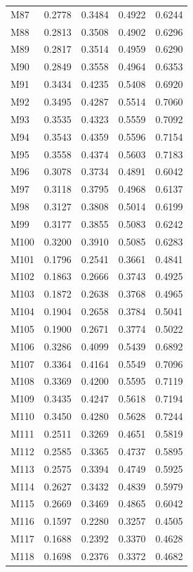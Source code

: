 \begin{longtable}{lrrrr}
M87 & 0.2778 & 0.3484 & 0.4922 & 0.6244 \\
M88 & 0.2813 & 0.3508 & 0.4902 & 0.6296 \\
M89 & 0.2817 & 0.3514 & 0.4959 & 0.6290 \\
M90 & 0.2849 & 0.3558 & 0.4964 & 0.6353 \\
M91 & 0.3434 & 0.4235 & 0.5408 & 0.6920 \\
M92 & 0.3495 & 0.4287 & 0.5514 & 0.7060 \\
M93 & 0.3535 & 0.4323 & 0.5559 & 0.7092 \\
M94 & 0.3543 & 0.4359 & 0.5596 & 0.7154 \\
M95 & 0.3558 & 0.4374 & 0.5603 & 0.7183 \\
M96 & 0.3078 & 0.3734 & 0.4891 & 0.6042 \\
M97 & 0.3118 & 0.3795 & 0.4968 & 0.6137 \\
M98 & 0.3127 & 0.3808 & 0.5014 & 0.6199 \\
M99 & 0.3177 & 0.3855 & 0.5083 & 0.6242 \\
M100 & 0.3200 & 0.3910 & 0.5085 & 0.6283 \\
M101 & 0.1796 & 0.2541 & 0.3661 & 0.4841 \\
M102 & 0.1863 & 0.2666 & 0.3743 & 0.4925 \\
M103 & 0.1872 & 0.2638 & 0.3768 & 0.4965 \\
M104 & 0.1904 & 0.2658 & 0.3784 & 0.5041 \\
M105 & 0.1900 & 0.2671 & 0.3774 & 0.5022 \\
M106 & 0.3286 & 0.4099 & 0.5439 & 0.6892 \\
M107 & 0.3364 & 0.4164 & 0.5549 & 0.7096 \\
M108 & 0.3369 & 0.4200 & 0.5595 & 0.7119 \\
M109 & 0.3435 & 0.4247 & 0.5618 & 0.7194 \\
M110 & 0.3450 & 0.4280 & 0.5628 & 0.7244 \\
M111 & 0.2511 & 0.3269 & 0.4651 & 0.5819 \\
M112 & 0.2585 & 0.3365 & 0.4737 & 0.5895 \\
M113 & 0.2575 & 0.3394 & 0.4749 & 0.5925 \\
M114 & 0.2627 & 0.3432 & 0.4839 & 0.5979 \\
M115 & 0.2669 & 0.3469 & 0.4865 & 0.6042 \\
M116 & 0.1597 & 0.2280 & 0.3257 & 0.4505 \\
M117 & 0.1688 & 0.2392 & 0.3370 & 0.4628 \\
M118 & 0.1698 & 0.2376 & 0.3372 & 0.4682 \\

\end{longtable}
